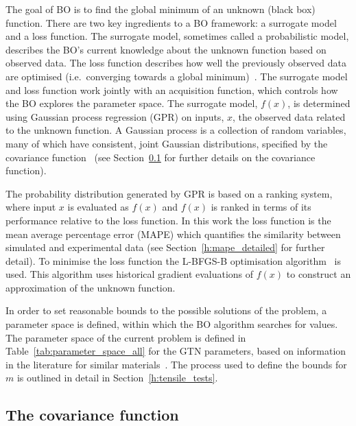 \documentclass[preprint, review, 12pt]{elsarticle}
\begin{document}
	The goal of BO is to find the global minimum of an unknown (black box) function.
	There are two key ingredients to a BO framework: a surrogate model and a loss function.
	The surrogate model, sometimes called a probabilistic model, describes the BO's current knowledge about the unknown function based on observed data.
	The loss function describes how well the previously observed data are optimised (i.e.\ converging towards a global minimum)~\cite{SHAHRIARI2016}.
	The surrogate model and loss function work jointly with an acquisition function, which controls how the BO explores the parameter space.
	The surrogate model, $f(x)$, is determined using Gaussian process regression (GPR) on inputs, $x$, the observed data related to the unknown function.
	A Gaussian process is a collection of random variables, many of which have consistent, joint Gaussian distributions, specified by the covariance function~\cite{RASMUSSEN2004, RASMUSSEN2006} (see Section~\ref{h:covariance_function} for further details on the covariance function).

	The probability distribution generated by GPR is based on a ranking system, where input $x$ is evaluated as $f(x)$ and $f(x)$ is ranked in terms of its performance relative to the loss function.
	In this work the loss function is the mean average percentage error (MAPE) which quantifies the similarity between simulated and experimental data (see Section~\ref{h:mape_detailed} for further detail).
	To minimise the loss function the L-BFGS-B optimisation algorithm~\cite{ZHU1997} is used.
	This algorithm uses historical gradient evaluations of $f(x)$ to construct an approximation of the unknown function.

	In order to set reasonable bounds to the possible solutions of the problem, a parameter space is defined, within which the BO algorithm searches for values.
	The parameter space of the current problem is defined in Table~\ref{tab:parameter_space_all} for the GTN parameters, based on information in the literature for similar materials~\cite{KIRAN2014,MEADE2020,DASSAULT2021}.
	The process used to define the bounds for $m$ is outlined in detail in Section~\ref{h:tensile_tests}.

	
	\subsection{The covariance function}
	\label{h:covariance_function}
\end{document}
